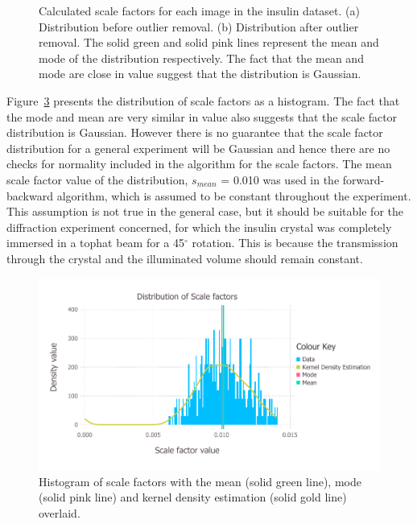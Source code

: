 \begin{figure}
\begin{subfigure}[b]{1.0\textwidth}
            \caption{}
            \label{fig:Scale factors per image after outlier removal - insulin}
    \end{subfigure}
    \caption[Calculated scale factors for each image in the insulin dataset.]{Calculated scale factors for each image in the insulin dataset.
    (a) Distribution before outlier removal.
    (b) Distribution after outlier removal.
    The solid green and solid pink lines represent the mean and mode of the distribution respectively.
    The fact that the mean and mode are close in value suggest that the distribution is Gaussian.}
    \label{fig:Scale factors per image - insulin}
\end{figure}

Figure~\ref{fig:Scale factor distribution after outlier removal - insulin} presents the distribution of scale factors as a histogram.
The fact that the mode and mean are very similar in value also suggests that the scale factor distribution is Gaussian.
However there is no guarantee that the scale factor distribution for a general experiment will be Gaussian and hence there are no checks for normality included in the algorithm for the scale factors.
The mean scale factor value of the distribution, $s_{mean}$ = 0.010 was used in the forward-backward algorithm, which is assumed to be constant throughout the experiment.
This assumption is not true in the general case, but it should be suitable for the diffraction experiment concerned, for which the insulin crystal was completely immersed in a tophat beam for a 45$^{\circ}$ rotation.
This is because the transmission through the crystal and the illuminated volume should remain constant.
\begin{figure}[ht!]
    \centering
    \includegraphics[width=1.0\textwidth]{figures/datared/ScaleFac_Distribution.pdf}
    \caption[Histogram of scale factors for insulin dataset.]{Histogram of scale factors with the mean (solid green line), mode (solid pink line) and kernel density estimation (solid gold line) overlaid.}
    \label{fig:Scale factor distribution after outlier removal - insulin}
\end{figure}

